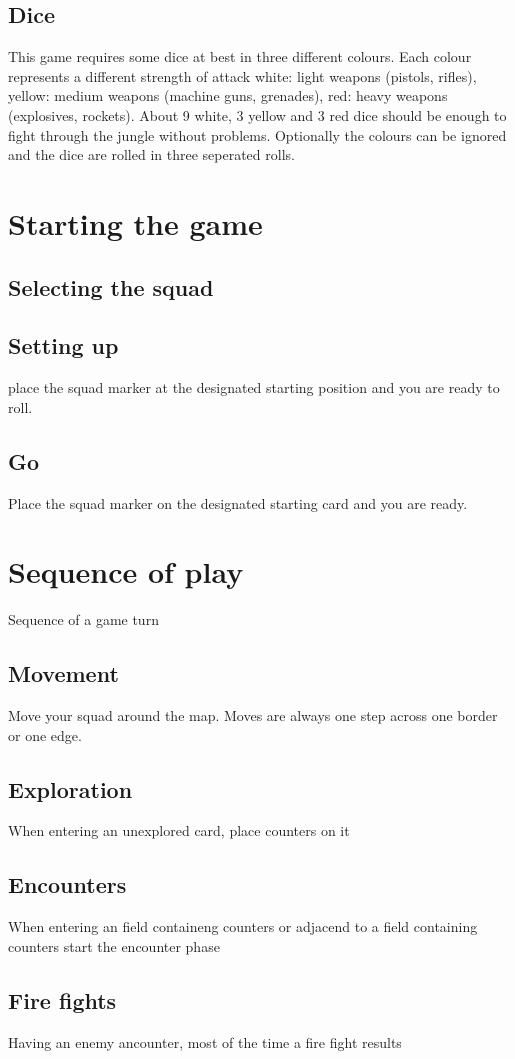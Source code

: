 \documentclass[twocolumn,titlepage]{article}
\begin{document}
\subsection{Dice}
This game requires some dice at best in three different colours. Each colour represents a different strength of attack white: light weapons (pistols, rifles), yellow: medium weapons (machine guns, grenades), red: heavy weapons (explosives, rockets). About 9 white, 3 yellow and 3 red dice should be enough to fight through the jungle without problems. Optionally the colours can be ignored and the dice are rolled in three seperated rolls.
\section{Starting the game}
\subsection{Selecting the squad}
\subsection{Setting up}
place the squad marker at the designated starting position and you are ready to roll.
\subsection{Go}
Place the squad marker on the designated starting card and you are ready.
\section{Sequence of play}
Sequence of a game turn
\subsection{Movement}
Move your squad around the map. Moves are always one step across one border or one edge.
\subsection{Exploration}
When entering an unexplored card, place counters on it
\subsection{Encounters}
When entering an field containeng counters or adjacend to a field containing counters start the encounter phase
\subsection{Fire fights}
Having an enemy ancounter, most of the time a fire fight results
\end{document}
